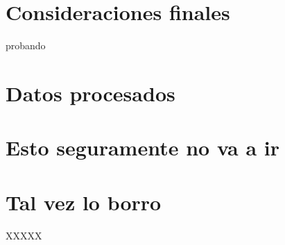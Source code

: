 \documentclass[msc,oneside,a4paper]{udelar}\usepackage[]{graphicx}\usepackage[]{color}
\begin{document}
\chapter{Consideraciones finales}

probando



% 
  \backmatter 
  
  \bibend
  \glosario
  \apenarabicnumbering
  \apenmatter


\chapter{Datos procesados}




\chapter{Esto seguramente no va a ir}\label{Ape2}

  \anexarabicnumbering
  \anexmatter


\chapter{Tal vez lo borro}\label{Ane1}

XXXXX

\end{document}
